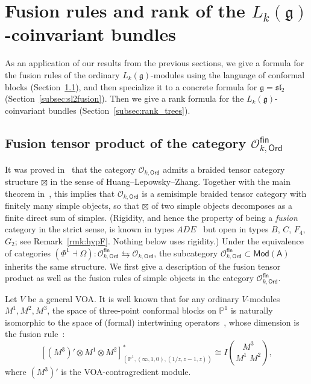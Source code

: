 \documentclass[12pt,a4paper,reqno]{amsart}
\numberwithin{equation}{section}
\theoremstyle{definition}
\newcommand{\g}{\mathfrak{g}}
\renewcommand{\sl}{\mathfrak{sl}}
\renewcommand{\P}{\mathbb{P}}
\newcommand{\fusion}[3]{{\binom{#3}{#1\;#2}}}
\def\O{\mathcal{O}}
\def\Ord{\mathsf{Ord}}
\def\Mod{\mathsf{Mod}}
\def\fin{\mathsf{fin}}
\def\L{\mathsf{L}}
\def\Om{\Omega}
\def\o{\otimes}
\def\A{\mathsf{A}}
\begin{document}
\section{Fusion rules and rank of the $L_k(\g)$-coinvariant bundles}\label{sec:fusion_rules}
As an application of our results from the previous sections, we give a formula for the fusion rules of the ordinary $L_k(\g)$-modules using the language of conformal blocks (Section~\ref{subsec:fusion3pt}), and then specialize it to a concrete formula for $\g=\sl_2$ (Section~\ref{subsec:sl2fusion}).
Then we give a rank formula for the $L_k(\g)$-coinvariant bundles (Section~\ref{subsec:rank_trees}).



\subsection{Fusion tensor product of the category $\O^\fin_{k,\Ord}$}\label{subsec:fusion3pt}
It was proved in~\cite{creutzig2018braided} that the category $\O_{k,\Ord}$ admits a braided tensor category structure $\boxtimes$ in the sense of Huang--Lepowsky--Zhang. Together with the main theorem in~\cite{A16}, this implies that $\O_{k,\Ord}$ is a semisimple braided tensor category with finitely many simple objects, so that $\boxtimes$ of two simple objects decomposes as a finite direct sum of simples. (Rigidity, and hence the property of being a \emph{fusion} category in the strict sense, is known in types $ADE$~\cite{Creutzig19} but open in types $B$, $C$, $F_4$, $G_2$; see Remark~\ref{rmk:hypF}. Nothing below uses rigidity.) Under the equivalence of categories  $(\Phi^\L\dashv \Om):\O_{k,\Ord}^\fin\leftrightarrows \O_{k,\Ord}$, the subcategory $\O_{k,\Ord}^\fin\subset \Mod(\A)$ inherits the same structure.
We first give a description of the fusion tensor product as well as the fusion rules of simple objects in the category $\O_{k,\Ord}^\fin$.



Let $V$ be a general VOA. 
It is well known that for any ordinary $V$-modules $M^1,M^2,M^3$, the space of three-point conformal blocks on $\P^1$ is naturally isomorphic to the space of (formal) intertwining operators~\cite{FHL93}, whose dimension is the fusion rule~\cite{TUY,L23,GLZ24}:
\begin{equation}\label{eq:cb_io}
 [(M^3)'\o M^1\o M^2]^\ast_{(\P^1,(\infty,1,0),(1/z,z-1,z))}\cong I\fusion{M^1}{M^2}{M^3},
 \end{equation}
where $(M^3)'$ is the VOA-contragredient module.
\end{document}
